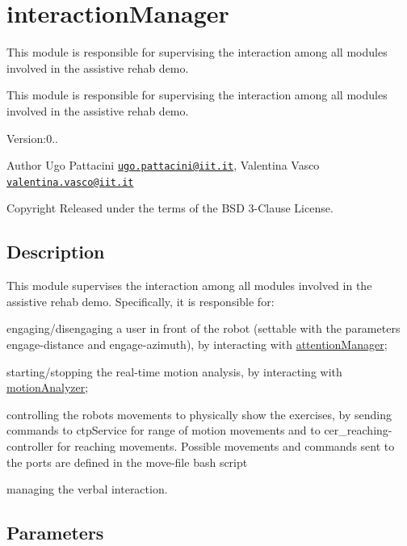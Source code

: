 \section{interaction\+Manager}
\label{group__interactionManager}


This module is responsible for supervising the interaction among all modules involved in the assistive rehab demo.  


This module is responsible for supervising the interaction among all modules involved in the assistive rehab demo. 

Version\+:0.. \begin{DoxyAuthor}{Author}
Ugo Pattacini \href{mailto:ugo.pattacini@iit.it}{\tt ugo.\+pattacini@iit.\+it}, Valentina Vasco \href{mailto:valentina.vasco@iit.it}{\tt valentina.\+vasco@iit.\+it} ~\newline
 
\end{DoxyAuthor}
\begin{DoxyCopyright}{Copyright}
Released under the terms of the B\+SD 3-\/\+Clause License. 
\end{DoxyCopyright}
\hypertarget{group__skeletonViewer_intro_sec}{}\subsection{Description}\label{group__skeletonViewer_intro_sec}
This module supervises the interaction among all modules involved in the assistive rehab demo. Specifically, it is responsible for\+:
\begin{DoxyItemize}
\item engaging/disengaging a user in front of the robot (settable with the parameters engage-\/distance and engage-\/azimuth), by interacting with \hyperlink{group__attentionManager}{attention\+Manager};
\item starting/stopping the real-\/time motion analysis, by interacting with \hyperlink{group__motionAnalyzer}{motion\+Analyzer};
\item controlling the robot\textquotesingle{}s movements to physically show the exercises, by sending commands to ctp\+Service for range of motion movements and to cer\+\_\+reaching-\/controller for reaching movements. Possible movements and commands sent to the ports are defined in the move-\/file bash script
\item managing the verbal interaction.
\end{DoxyItemize}\hypertarget{group__skeletonViewer_parameters_sec}{}\subsection{Parameters}\label{group__skeletonViewer_parameters_sec}

